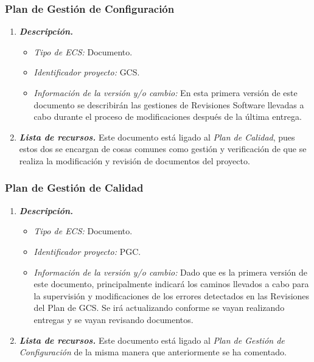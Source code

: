 \documentclass[11pt, a4paper, twoside, titlepage]{article}
\begin{document}
			\subsubsection{Plan de Gestión de Configuración}
			\begin{enumerate}
				\item {\itshape \bfseries Descripción.}
						\begin{itemize}
							\item \textit{Tipo de ECS:} Documento.
							\item \textit{Identificador proyecto:} GCS.
							\item \textit{Información de la versión y/o cambio:} En esta primera versión de este documento se describirán las gestiones de Revisiones Software llevadas a cabo durante el proceso de modificaciones después de la última entrega.
						\end{itemize}

					\item {\itshape \bfseries Lista de recursos.}
						Este documento está ligado al \textit{Plan de Calidad}, pues estos dos se encargan de cosas comunes como gestión y verificación de que se realiza la modificación y revisión de documentos del proyecto.
				\end{enumerate}

			\subsubsection{Plan de Gestión de Calidad}
			\begin{enumerate}
				\item {\itshape \bfseries Descripción.}
						\begin{itemize}
							\item \textit{Tipo de ECS:} Documento.
							\item \textit{Identificador proyecto:} PGC.
							\item \textit{Información de la versión y/o cambio:} Dado que es la primera versión de este documento, principalmente indicará los caminos llevados a cabo para la supervisión y modificaciones de los errores detectados en las Revisiones del Plan de GCS. Se irá actualizando conforme se vayan realizando entregas y se vayan revisando documentos.
						\end{itemize}

					\item {\itshape \bfseries Lista de recursos.}
						Este documento está ligado al \textit{Plan de Gestión de Configuración} de la misma manera que anteriormente se ha comentado.
				\end{enumerate}
\end{document}
